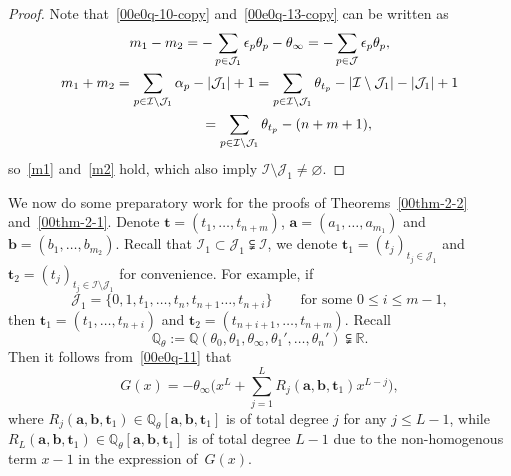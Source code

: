 \documentclass[10pt,a4paper]{amsart}
\numberwithin{equation}{section}
\def\Q{\mathbb Q}
\def\R{\mathbb R}
\begin{document}
\begin{proof} Note that~\eqref{00e0q-10-copy} and~\eqref{00e0q-13-copy} can be written as
\begin{gather*}
m_1-m_2=-\sum_{p\in\mathcal{J}_1}\epsilon_p\theta_p-\theta_\infty=-\sum_{p\in\mathcal{J}}\epsilon_p\theta_p,\\
m_1+m_2 =\sum_{p\in \mathcal{I}\setminus\mathcal{J}_1}{\alpha}_{p}-|\mathcal{J}_1|+1=\sum_{p\in \mathcal{I}\setminus\mathcal{J}_1}\theta_{t_p}-|\mathcal{I}\setminus\mathcal{J}_1|-|\mathcal{J}_1|+1\\
\hphantom{m_1+m_2}{}
=\sum_{p\in \mathcal{I}\setminus\mathcal{J}_1}\theta_{t_p}-(n+m+1),
\end{gather*}
so~\eqref{m1} and~\eqref{m2} hold, which
also imply $\mathcal{I}\setminus \mathcal{J}_1\neq\varnothing$.
\end{proof}

We now do some preparatory work for the proofs of Theorems~\ref{00thm-2-2} and~\ref{00thm-2-1}.
Denote $\boldsymbol t=(t_1,\dots,t_{n+m})$,
$\boldsymbol
a=(a_1,\dots,a_{m_1})$ and $\boldsymbol b=(b_1,\dots,b_{m_2})$.
Recall that $\mathcal{I}_1\subset\mathcal{J}_1\subsetneqq \mathcal{I}$, we denote
$\boldsymbol t_1=(t_j)_{t_j\in \mathcal{J}_1}$ and $\boldsymbol
t_2=(t_j)_{t_j\in \mathcal{I}\setminus\mathcal{J}_1}$ for
convenience. For example, if
\[
 \mathcal{J}_1=\{0,1,t_1,\dots, t_n, t_{n+1}\dots, t_{n+i}\}
 \qquad\text{for some $0\leq i\leq m-1$},
\]
then $\boldsymbol t_1=(t_1,\dots,t_{n+i})$ and $\boldsymbol
t_2=(t_{n+i+1},\dots, t_{n+m})$. Recall
\[
 \Q_{\theta}:=\Q(\theta_0,\theta_1,\theta_\infty,\theta_1',
 \dots,\theta_n')\subsetneqq\R.
\]
 Then
it follows from~\eqref{00e0q-11} that
\begin{equation}\label{g111111}
G(x)=-\theta_{\infty}\Bigg(x^{L}+\sum_{j=1}^{L}R_j(\boldsymbol a,\boldsymbol b,\boldsymbol t_1)x^{L-j}\Bigg),
\end{equation}
where %
$R_j(\boldsymbol a,\boldsymbol b,\boldsymbol t_1)\in\mathbb{Q}_{\theta}[\boldsymbol a,\boldsymbol b,\boldsymbol t_1] $ is of total degree $j$ for any $j\leq L-1$, while $R_L(\boldsymbol a,\boldsymbol b, \boldsymbol t_1)\in\mathbb{Q}_{\theta}[\boldsymbol a,\boldsymbol b,\boldsymbol t_1] $ is of total degree $L-1$ due to the non-homogenous term $x-1$ in the expression of~$G(x)$.
\end{document}
